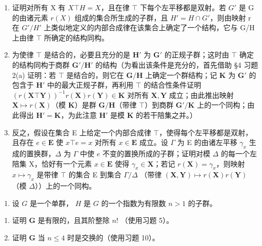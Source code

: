 \begin{enumerate}
\def\labelenumi{(\alph{enumi})}
\item
  证明对所有 X 有 \(X \top H = X\)，且在律 \(\top\) 下每个左平移都是双射。若 \(G'\) 是 G 的由诸元素 \(r(X)\) 组成的集合所生成的子群，且 \(H' = H \cap G'\)，则由映射 r 在 \(G'/H'\) 上类似地定义的内部合成律在该集合上确定了一个结构，它与 G/H 上由律 \(\top\) 所确定的结构同构。
\item
  为使律 \(\top\) 是结合的，必要且充分的是 \(\mathbf{H}'\) 为 \(\mathbf{G}'\) 的正规子群；这时由 \(\top\) 确定的结构同构于商群 \(\mathbf{G}' / \mathbf{H}'\) 的结构（为看出该条件是充分的，首先借助 §4 习题 2(a) 证明：若 \(\top\) 是结合的，则它在 \(\mathbf{G} / \mathbf{H}\) 上确定一个群结构；记 \(\mathbf{K}\) 为 \(\mathbf{G}'\) 的包含于 \(\mathbf{H}'\) 中的最大正规子群，再利用 \(\top\) 的结合性条件证明 \((r(\mathbf{X} \top \mathbf{Y}))^{-1} r(\mathbf{X}) r(\mathbf{Y}) \in \mathbf{K}\) 对所有 \(\mathbf{X}, \mathbf{Y}\) 成立；由此推出映射 \(\mathbf{X} \mapsto r(\mathbf{X})\)（模 \(\mathbf{K}\)）是群 \(\mathbf{G} / \mathbf{H}\)（带律 \(\top\)）到商群 \(\mathbf{G}' / \mathbf{K}\) 上的一个同构；由此得出 \(\mathbf{H}' = \mathbf{K}\)，为此注意 \(\mathbf{H}'\) 是模 \(\mathbf{K}\) 的若干陪集之并。）
\item
  反之，假设在集合 E 上给定一个内部合成律 \(\top\)，使得每个左平移都是双射，且存在 \(e \in \mathbf{E}\) 使 \(x \top e = x\) 对所有 \(x \in \mathbf{E}\) 成立。设 \(\Gamma\) 为 E 的由诸左平移 \(\gamma_x\) 生成的置换群，\(\Delta\) 为 \(\Gamma\) 中使 \(e\) 不变的置换所成的子群；证明对模 \(\Delta\) 的每一个左陪集 X，恰好有一个元素 \(x \in \mathbf{E}\) 使得 \(\gamma_x \in \mathbf{X}\)；若记 \(r(\mathbf{X}) = \gamma_x\)，则映射 \(x \mapsto \gamma_x\) 是带律 \(\top\) 的集合 E 到集合 \(\Gamma / \Delta\) （带律 \((\mathbf{X}, \mathbf{Y}) \mapsto r(\mathbf{X})r(\mathbf{Y})\)（模 \(\Delta\)））上的一个同构。
\end{enumerate}

\begin{enumerate}
\def\labelenumi{\arabic{enumi}。}
\setcounter{enumi}{19}
\tightlist
\item
  设 \(G\) 是一个单群， \(H\) 是 \(G\) 的一个指数为有限数 \(n > 1\) 的子群。
\end{enumerate}

\begin{enumerate}
\def\labelenumi{(\alph{enumi})}
\item
  证明 \(\mathbf{G}\) 是有限的，且其阶整除 \(n!\) （使用习题 5）。
\item
  证明 \(\mathbf{G}\) 当 \(n \leqslant 4\) 时是交换的（使用习题 10）。
\end{enumerate}

